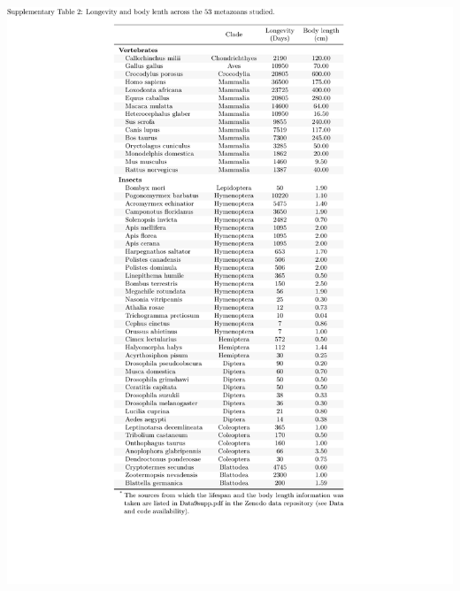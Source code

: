 \begin{table}[h!]
    \begin{center}                                                                       
        \includegraphics[width=\textwidth] {Table2_supp.pdf}
    \end{center}
    \caption[Longevity and body lenth across the 53 metazoans studied]{}
    \label{table:2}
\end{table}


